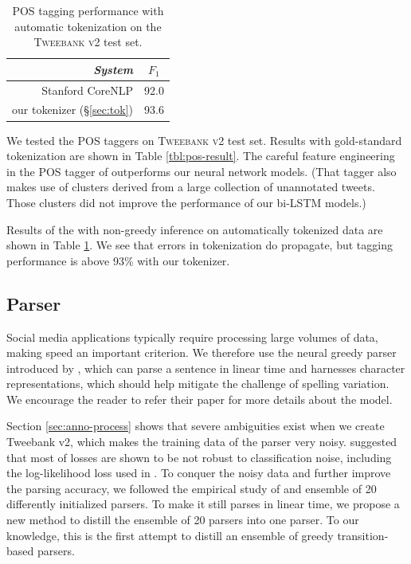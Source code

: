 \documentclass[11pt,a4paper]{article}
\newcommand{\nascomment}[1]{\textcolor{blue}{[#1 ---\textsc{nas}]}}
\begin{document}
\begin{table}[t]
	\centering
	\begin{tabular}{rc}
		\hline
		\it System & $F_1$ \\
		\hline
		Stanford CoreNLP & 92.0 \\
		our tokenizer (\S\ref{sec:tok}) & 93.6 \\
		\hline
	\end{tabular}
	\caption{\citet{owoputi-EtAl:2013:NAACL-HLT} POS tagging performance with automatic tokenization on
          the \textsc{Tweebank v2} test set. \label{tbl:pos-result-vs-tok}}
\end{table}

We tested the POS taggers on \textsc{Tweebank v2} test set.  Results
with gold-standard tokenization are shown in
Table \ref{tbl:pos-result}. The careful feature engineering in the 
POS tagger of \citet{owoputi-EtAl:2013:NAACL-HLT} outperforms our neural network
models.  (That tagger also makes use of \citet{Brown:1992:CNG:176313.176316} clusters derived
from a large collection of unannotated tweets.  Those clusters did not
improve the performance of our bi-LSTM models.)

Results of the \citet{owoputi-EtAl:2013:NAACL-HLT}  with non-greedy
inference on automatically tokenized data
are shown in  Table \ref{tbl:pos-result-vs-tok}.  We see that errors
in tokenization do propagate, but tagging performance is above 93\%
with our tokenizer.

\subsection{Parser}

Social media applications typically require processing large volumes
of data, making speed an important criterion. We therefore 
use the neural greedy parser introduced by ,
which can parse a sentence in linear time and harnesses 
character representations, which should help mitigate the challenge of
spelling variation. We encourage the reader to refer their paper for
more details about the model.

Section \ref{sec:anno-process} shows that severe ambiguities
exist when we create {\sc Tweebank v2}, which makes the training data
of the parser very noisy. \citet{Frnay2014ClassificationIT} suggested
that most of losses are shown to be not robust to 
classification noise, including the log-likelihood loss used in
\citet{ballesteros-dyer-smith:2015:EMNLP}. To conquer the noisy
data and further improve the parsing accuracy, we followed the
empirical study of \citet{Dietterich2000} and ensemble of 20 differently
initialized parsers. To make it still parses in linear time, we
propose a new method to distill the ensemble of 20 parsers into one parser.
To our knowledge, this is the first attempt to distill an
ensemble of greedy transition-based
parsers.%
\end{document}
